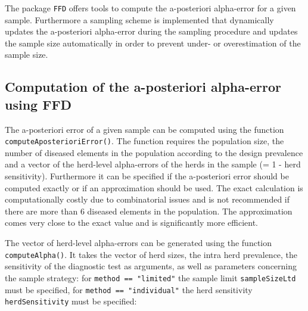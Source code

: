 \documentclass[nojss]{jss}
\begin{document}
The package \texttt{FFD} offers tools to compute the a-posteriori 
alpha-error for a given sample. Furthermore a sampling scheme is 
implemented that dynamically updates the a-posteriori alpha-error 
during the sampling procedure and updates the sample size 
automatically in order to prevent under- or overestimation of the 
sample size. 

\subsection{Computation of the a-posteriori alpha-error using FFD} 

The a-posteriori error of a given sample can be computed using the 
function \texttt{computeAposterioriError()}. 
 The function requires the 
population size, the number of diseased elements in the population 
according to the design prevalence and a vector of the herd-level 
alpha-errors of the herds in the sample (= 1 - herd sensitivity). 
Furthermore it can be specified if the a-posteriori error should be 
computed exactly or if an approximation should be used. The exact 
calculation is computationally costly due to combinatorial issues 
and is not recommended if there are more than 6 diseased elements in 
the population. The approximation comes very close to the exact 
value and is significantly more efficient. 

The vector of herd-level alpha-errors can be generated using the 
function \texttt{computeAlpha()}.  It 
takes the vector of herd sizes, the intra herd prevalence, the 
sensitivity of the diagnostic test as arguments, as well as 
parameters concerning the sample strategy: for \texttt{method == 
"limited"} the sample limit \texttt{sampleSizeLtd} must be 
specified, for \texttt{method == "individual"} the herd sensitivity 
\texttt{herdSensitivity} must be specified:
\end{document}
